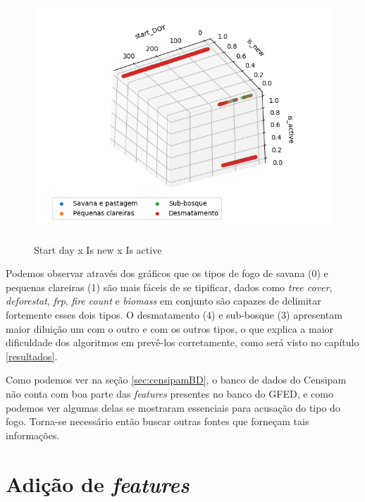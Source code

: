 \begin{multicols}{2}
\begin{figure}[H]
    \caption{Start day x Is new x Is active}
     
    \centering 
    \includegraphics[width=1.1\linewidth]{tg1/figuras/start_DOYxis_newxis_active--30-120.png}
    \label{figura:seven}
\end{figure}
            
\end{multicols}

Podemos observar através dos gráficos que os tipos de fogo de savana (0) e pequenas clareiras (1) são mais fáceis de se tipificar, dados como \textit{tree cover}, \textit{deforestat}, \textit{frp}, \textit{fire count} e \textit{biomass} em conjunto são capazes de delimitar fortemente esses dois tipos. O desmatamento (4) e sub-bosque (3) apresentam maior diluição um com o outro e com os outros tipos, o que explica a maior dificuldade dos algoritmos em prevê-los corretamente, como será visto no capítulo \ref{resultados}.

Como podemos ver na seção \ref{sec:censipamBD}, o banco de dados do Censipam não conta com boa parte das \textit{features} presentes no banco do GFED, e como podemos ver algumas delas se mostraram essenciais para acusação do tipo do fogo. Torna-se necessário então buscar outras fontes que forneçam tais informações.


\section{Adição de \textit{features}}

